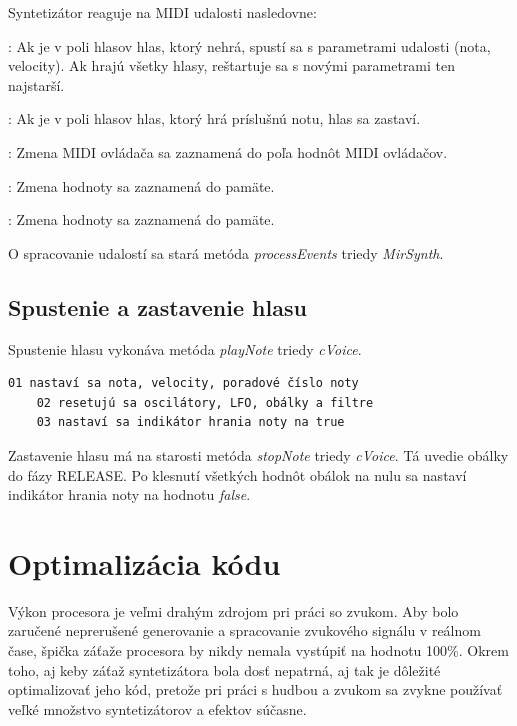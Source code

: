 Syntetizátor reaguje na MIDI udalosti nasledovne:

\begin{description}
\setlength{\itemsep}{-0.5ex}
\item[NOTE ON]: Ak je v poli hlasov hlas, ktorý nehrá, spustí sa s parametrami udalosti (nota, velocity). Ak hrajú všetky hlasy, reštartuje sa s novými parametrami ten najstarší.
\item[NOTE OFF]: Ak je v poli hlasov hlas, ktorý hrá príslušnú notu, hlas sa zastaví.
\item[CC]: Zmena MIDI ovládača sa zaznamená do poľa hodnôt MIDI ovládačov.
\item[AFTERTOUCH]: Zmena hodnoty sa zaznamená do pamäte.
\item[PITCH-WHEEL]: Zmena hodnoty sa zaznamená do pamäte.
\end{description}

O spracovanie udalostí sa stará metóda \emph{processEvents} triedy \emph{MirSynth}.

\subsection{Spustenie a zastavenie hlasu}

Spustenie hlasu vykonáva metóda \emph{playNote} triedy \emph{cVoice}.

\begin{Verbatim}[fontsize=\relsize{-1.5}]
	01 nastaví sa nota, velocity, poradové číslo noty
	02 resetujú sa oscilátory, LFO, obálky a filtre
	03 nastaví sa indikátor hrania noty na true
\end{Verbatim}

Zastavenie hlasu má na starosti metóda \emph{stopNote} triedy \emph{cVoice}. Tá uvedie obálky do fázy RELEASE. Po klesnutí všetkých hodnôt obálok na nulu sa 
nastaví indikátor hrania noty na hodnotu \emph{false}.

\section{Optimalizácia kódu}

Výkon procesora je veľmi drahým zdrojom pri práci so zvukom. Aby bolo zaručené neprerušené generovanie a spracovanie zvukového signálu v reálnom čase, špička záťaže procesora by nikdy nemala vystúpiť na hodnotu 100\%. Okrem toho, aj keby záťaž syntetizátora bola dosť nepatrná, aj tak je dôležité optimalizovať jeho kód, pretože pri práci s hudbou a zvukom sa zvykne používať veľké množstvo syntetizátorov a efektov súčasne.

